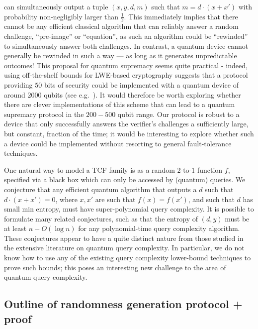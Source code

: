\documentclass[11pt]{article}
\theoremstyle{remark}
\theoremstyle{definition}
\begin{document}
can simultaneously output a tuple $(x, y, d, m)$ such that $m=d\cdot(x + x')$ with probability non-negligibly larger than $\frac{1}{2}$. This immediately implies that there cannot be any efficient classical algorithm that can reliably answer a random 
challenge, ``pre-image'' or ``equation'', as such an algorithm could be ``rewinded'' to simultaneously answer both challenges. In contrast, a quantum device cannot generally be rewinded in such a way --- as long as it generates unpredictable outcomes! This proposal for quantum supremacy seems quite practical - indeed, using off-the-shelf bounds for  LWE-based cryptography suggests that a protocol providing $50$ bits of security could be implemented with a quantum device of around $2000$ qubits (see e.g.~\cite{lindner2011better}). It would therefore be worth exploring whether there are clever implementations of this scheme 
that can lead to a quantum supremacy protocol in the $200-500$ qubit range. Our protocol is robust to a device that only successfully answers the verifier's challenges a sufficiently large, but constant, fraction of the time; it would be interesting to explore whether such a device could be implemented without resorting to general fault-tolerance techniques. 

One natural way to model a TCF family is as a random $2$-to-$1$ function $f$, specified via a black box which can only be accessed by (quantum) queries.
We conjecture that any efficient quantum 
algorithm that outputs a $d$ such that $ d\cdot(x + x') = 0$, where $x,x'$ are such that $f(x) = f(x')$, and such that $d$ has small min entropy, must have super-polynomial query complexity. 
It is possible to formulate many related conjectures, such as that the entropy of $(d, y)$ must be at least $n - O(\log n)$ for any 
polynomial-time query complexity algorithm. These conjectures appear to have a quite distinct nature from those studied in the 
extensive literature on quantum query complexity. In particular, we do not know how to use 
any of the existing query complexity lower-bound techniques to prove such bounds;  this poses an interesting new challenge to 
the area of quantum query complexity. 

\subsection*{Outline of randomness generation protocol + proof}
\end{document}
